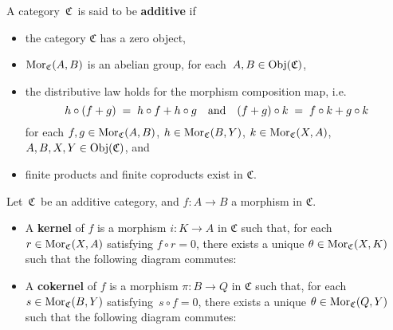 
\vskip 0.5cm
\begin{definition}
\mbox{}
\vskip 0.15cm
\noindent
A category \,$\mathfrak{C}$\, is said to be \textbf{additive} if
\begin{itemize}
\item
	the category $\mathfrak{C}$ has a zero object,
\item
	$\textnormal{Mor}_{\mathfrak{C}}(A,B)$ is an abelian group, for each \,$A, B \in \textnormal{Obj}(\mathfrak{C})$,
\item
	the distributive law holds for the morphism composition map, i.e.
	\begin{equation*}
	h \circ (f + g) \; = \; h \circ f + h \circ g
	\quad\textnormal{and}\quad
	(f + g) \circ k \; = \; f \circ k + g \circ k
	\end{equation*}
	for each
	$f, g \in \textnormal{Mor}_{\mathfrak{C}}(A,B)$,
	$h \in \textnormal{Mor}_{\mathfrak{C}}(B,Y)$,
	$k \in \textnormal{Mor}_{\mathfrak{C}}(X,A)$,
	$A, B, X, Y \in \textnormal{Obj}(\mathfrak{C})$, and
\item
	finite products and finite coproducts exist in $\mathfrak{C}$.
\end{itemize}
\end{definition}


\vskip 0.5cm
\begin{definition}
\mbox{}
\vskip 0.15cm
\noindent
Let \,$\mathfrak{C}$\, be an additive category, and $f : A \longrightarrow B$ a morphism in $\mathfrak{C}$.
\begin{itemize}
\item
	A \textbf{kernel} of $f$ is a morphism $i : K \longrightarrow A$ in $\mathfrak{C}$ such that,
	for each $r \in \textnormal{Mor}_{\mathfrak{C}}(X,A)$ satisfying $f \circ r = 0$,
	there exists a unique $\theta \in \textnormal{Mor}_{\mathfrak{C}}(X,K)$ such that the following diagram commutes:
	\begin{center}
	\end{center}
\item
	A \textbf{cokernel} of $f$ is a morphism $\pi : B \longrightarrow Q$ in $\mathfrak{C}$ such that,
	for each $s \in \textnormal{Mor}_{\mathfrak{C}}(B,Y)$ satisfying \,$s \circ f = 0$,
	there exists a unique $\theta \in \textnormal{Mor}_{\mathfrak{C}}(Q,Y)$ such that the following diagram commutes:
	\begin{center}
	\end{center}
\end{itemize}
\end{definition}

